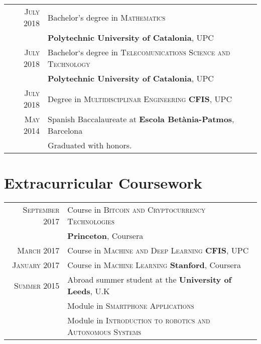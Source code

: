 \documentclass[a4paper,10pt]{article} %
\begin{document}
\begin{tabular}{rl}	
\textsc{July} 2018 & Bachelor's degree in \textsc{Mathematics} \\ & \textbf{Polytechnic University of Catalonia}, UPC\\


\textsc{July} 2018 &  Bachelor`s degree in \textsc{Telecomunications Science and Technology}\\ & \textbf{Polytechnic University of Catalonia}, UPC\\

\textsc{July} 2018 &  Degree in \textsc{Multidisciplinar Engineering} \textbf{CFIS}, UPC\\


\textsc{May} 2014 & Spanish Baccalaureate at \textbf{Escola Betània-Patmos}, Barcelona \\ &  Graduated with honors. \\
\end{tabular}



\section{Extracurricular Coursework}
\begin{tabular}{rl}	
\textsc{September} 2017 &  Course in \textsc{Bitcoin and Cryptocurrency Technologies} \\
 & \textbf{Princeton}, Coursera\\

\textsc{March} 2017 &  Course in \textsc{Machine and Deep Learning} \textbf{CFIS}, UPC\\

\textsc{January} 2017 &  Course in \textsc{Machine Learning} \textbf{Stanford}, Coursera\\


\textsc{Summer} 2015 & Abroad summer student at the \textbf{University of Leeds}, U.K\\
& Module in \textsc{Smartphone Applications}\\ & Module in \textsc{Introduction to robotics and Autonomous Systems}\\
\end{tabular}
\vspace{-5pt}
\end{document}
